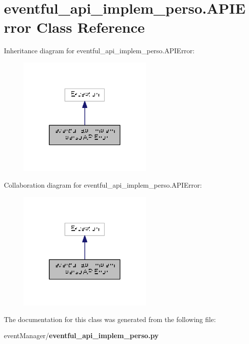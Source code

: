 \section{eventful\+\_\+api\+\_\+implem\+\_\+perso.\+A\+P\+I\+Error Class Reference}
\label{classeventful__api__implem__perso_1_1_a_p_i_error}


Inheritance diagram for eventful\+\_\+api\+\_\+implem\+\_\+perso.\+A\+P\+I\+Error\+:
\nopagebreak
\begin{figure}[H]
\begin{center}
\leavevmode
\includegraphics[width=189pt]{classeventful__api__implem__perso_1_1_a_p_i_error__inherit__graph}
\end{center}
\end{figure}


Collaboration diagram for eventful\+\_\+api\+\_\+implem\+\_\+perso.\+A\+P\+I\+Error\+:
\nopagebreak
\begin{figure}[H]
\begin{center}
\leavevmode
\includegraphics[width=189pt]{classeventful__api__implem__perso_1_1_a_p_i_error__coll__graph}
\end{center}
\end{figure}


The documentation for this class was generated from the following file\+:\begin{DoxyCompactItemize}
\item 
event\+Manager/{\bf eventful\+\_\+api\+\_\+implem\+\_\+perso.\+py}\end{DoxyCompactItemize}
